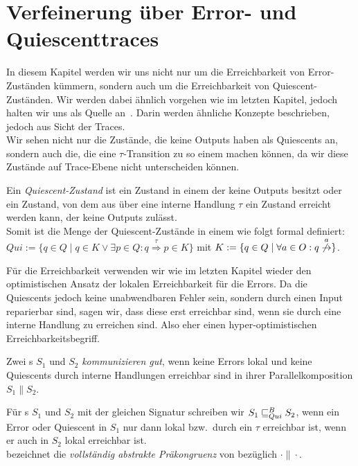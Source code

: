 \chapter{Verfeinerung über Error- und Quiescenttraces}

In diesem Kapitel werden wir uns nicht nur um die Erreichbarkeit von
Error-Zuständen kümmern, sondern auch um die Erreichbarkeit von
Quiescent-Zuständen. Wir werden dabei ähnlich vorgehen wie im letzten Kapitel,
jedoch halten wir uns als Quelle an~\cite{Chilton2013}. Darin werden ähnliche Konzepte
beschrieben, jedoch aus Sicht der Traces.\\
Wir sehen nicht nur die Zustände, die keine Outputs haben als Quiescents an,
sondern auch die, die eine $\tau$-Transition zu so einem machen können, da wir
diese Zustände auf Trace-Ebene nicht unterscheiden können.

\begin{Def}[Quiescent]
  Ein \emph{Quiescent-Zustand} ist ein Zustand in einem \EIO{} der keine Outputs besitzt
  oder ein Zustand, von dem aus über eine interne Handlung $\tau$ ein Zustand
  erreicht werden kann, der keine Outputs zulässt.\\
  Somit ist die Menge der Quiescent-Zustände in einem \EIO{} wie folgt formal
  definiert: $Qui:=\{q\in Q\mid q\in K\vee \exists p\in Q:
  q\overset{\tau}{\Rightarrow} p\in K\}$ mit $K:=\{q\in Q\mid \forall a\in O:
  q\overset{a}{\not{\hspace{-0.1cm}\rightarrow}}\}$.
\end{Def}

Für die Erreichbarkeit verwenden wir wie im letzten Kapitel wieder den
optimistischen Ansatz der lokalen Erreichbarkeit für die Errors. Da die
Quiescents jedoch keine unabwendbaren Fehler sein, sondern durch einen Input
reparierbar sind, sagen wir, dass diese erst erreichbar sind, wenn sie durch
eine interne Handlung zu erreichen sind. Also eher einen hyper-optimistischen
Erreichbarkeitsbegriff.

\begin{Def}
  Zwei \EIO{}s $S_1$ und $S_2$ \emph{kommunizieren gut}, wenn keine Errors
  lokal und keine Quiescents durch interne Handlungen
  erreichbar sind in ihrer Parallelkomposition $S_1\| S_2$.
\end{Def}

\begin{Def}
  Für \EIO{}s $S_1$ und $S_2$ mit der gleichen Signatur schreiben wir
  $S_1\sqsubseteq _{Qui}^B S_2$, wenn ein Error oder Quiescent in $S_1$ nur dann lokal bzw.\
  durch ein $\tau$ erreichbar ist, wenn er auch in $S_2$ lokal erreichbar
  ist.\\
  \QCRel{} bezeichnet die \emph{vollständig abstrakte Präkongruenz} von
  \QBRel{} bezüglich $\cdot\|\cdot$.
\end{Def}

